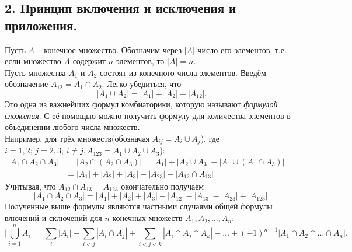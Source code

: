 \subsection*{2. Принцип включения и исключения и приложения.}
\indent
Пусть $A$ -- конечное множество.
Обозначим через $|A|$ число его элементов,
т.е. если множество $A$ содержит $n$ элементов,
то $|A| = n$.
\\ \indent
Пусть множества $A_1$ и $A_2$ состоят из 
конечного числа элементов.
Введём обозначение $A_{12} = A_1 \cap A_2$.
Легко убедиться, что
\[
|A_1 \cup A_2| =
|A_1|+|A_2|-|A_{12}|.
\]
Это одна из важнейших формул комбиаторики,
которую называют \textit{формулой сложения}.
С её помощью можно получить формулу для
количества элементов в объединении любого числа множеств.
\\ \indent
Например, для трёх множеств(обозначая $A_{ij} = A_i \cup A_j$),
где $i = 1,2; \, j = 2, 3; \, i \neq j, A_{123} =
A_1 \cup A_2 \cup A_3$):
\begin{equation*}
\begin{split}
|A_1 \cap A_2 \cap A_3| &= 
|A_2 \cap (A_2 \cap A_3)| = 
|A_1| + |A_2 \cup A_3| - 
|A_1 \cup (A_1 \cap A_3)| = \\
&= |A_1| + |A_2| + |A_3| - |A_{23}| -
|A_{12} \cap A_{13}|
\end{split}
\end{equation*}
Учитывая, что $A_{12} \cap A_{13} = A_{123}$
окончательно получаем
\[
|A_1 \cap A_2 \cap A_3| = 
|A_1| + |A_2| + |A_3| -
|A_{12}| - |A_{13}| - |A_{23}| + |A_{123}|.
\]
Полученные выше формулы являются частными случаями общей
формулы влючений и сключений для $n$ конечных
множеств $A_1, A_2, \ldots, A_n$:
\[
\biggl | \bigcup_{i=1}^{n}A_i \biggl | = \sum_{i} | A_i | - \sum_{i<j} | A_i \cap A_j | + \sum_{i<j<k} | A_i \cap A_j \cap A_k | - \ldots + (-1)^{n-1} | A_1 \cap A_2 \cap \ldots \cap A_n |.
\]
\newpage
